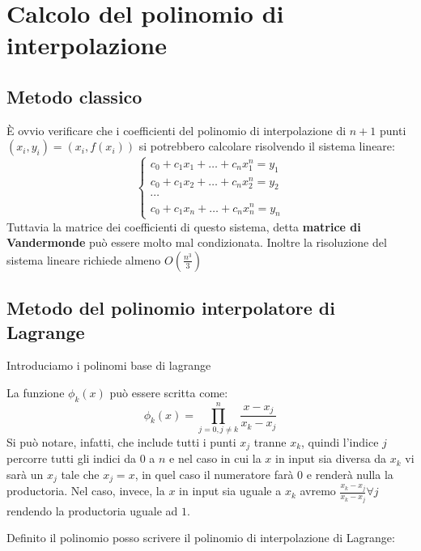 \section{Calcolo del polinomio di interpolazione}

\subsection{Metodo classico}
È ovvio verificare che i coefficienti del polinomio di interpolazione di $n+1$ punti $(x_i, y_i)=(x_i, f(x_i))$ si potrebbero calcolare risolvendo il sistema lineare:
\[
    \begin{cases}
        c_0 + c_1x_1 + \dots + c_n x^n_1 = y_1 \\
        c_0 + c_1x_2 + \dots + c_n x^n_2 = y_2 \\
        \cdots \\
        c_0 + c_1x_n + \dots + c_n x^n_n = y_n
    \end{cases}
\]
Tuttavia la matrice dei coefficienti di questo sistema, detta \textbf{matrice di Vandermonde} può essere molto mal condizionata. Inoltre la risoluzione del sistema lineare richiede almeno $O(\frac{n^3}{3})$

\subsection{Metodo del polinomio interpolatore di Lagrange}

Introduciamo i polinomi base di lagrange

La funzione $\phi_k(x)$ può essere scritta come:
\[
    \phi_k(x) = \prod_{j=0, j\neq k} ^ n \frac{x - x_j}{x_k - x_j}
\]
Si può notare, infatti, che include tutti i punti $x_j$ tranne $x_k$, quindi l'indice $j$ percorre tutti gli indici da $0$ a $n$ e nel caso in cui la $x$ in input sia diversa da $x_k$ vi sarà un $x_j$ tale che $x_j = x$, in quel caso il numeratore farà $0$ e renderà nulla la productoria. Nel caso, invece, la $x$ in input sia uguale a $x_k$ avremo $\frac{x_k - x_j}{x_k - x_j} \forall j$ rendendo la productoria uguale ad $1$.

Definito il polinomio posso scrivere il polinomio di interpolazione di Lagrange:

